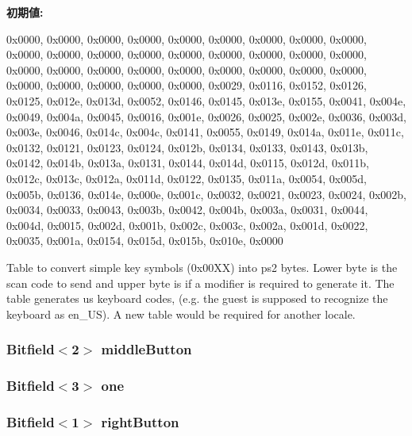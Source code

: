 \label{namespacePs2_a23aeb10a3924a5bdb7f4f9e21b03e515}
{\bfseries 初期値:}
\begin{DoxyCode}
 {

   0x0000, 0x0000, 0x0000, 0x0000, 0x0000, 0x0000, 0x0000, 0x0000, 
   0x0000, 0x0000, 0x0000, 0x0000, 0x0000, 0x0000, 0x0000, 0x0000, 
   0x0000, 0x0000, 0x0000, 0x0000, 0x0000, 0x0000, 0x0000, 0x0000, 
   0x0000, 0x0000, 0x0000, 0x0000, 0x0000, 0x0000, 0x0000, 0x0000, 
   0x0029, 0x0116, 0x0152, 0x0126, 0x0125, 0x012e, 0x013d, 0x0052, 
   0x0146, 0x0145, 0x013e, 0x0155, 0x0041, 0x004e, 0x0049, 0x004a, 
   0x0045, 0x0016, 0x001e, 0x0026, 0x0025, 0x002e, 0x0036, 0x003d, 
   0x003e, 0x0046, 0x014c, 0x004c, 0x0141, 0x0055, 0x0149, 0x014a, 
   0x011e, 0x011c, 0x0132, 0x0121, 0x0123, 0x0124, 0x012b, 0x0134, 
   0x0133, 0x0143, 0x013b, 0x0142, 0x014b, 0x013a, 0x0131, 0x0144, 
   0x014d, 0x0115, 0x012d, 0x011b, 0x012c, 0x013c, 0x012a, 0x011d, 
   0x0122, 0x0135, 0x011a, 0x0054, 0x005d, 0x005b, 0x0136, 0x014e, 
   0x000e, 0x001c, 0x0032, 0x0021, 0x0023, 0x0024, 0x002b, 0x0034, 
   0x0033, 0x0043, 0x003b, 0x0042, 0x004b, 0x003a, 0x0031, 0x0044, 
   0x004d, 0x0015, 0x002d, 0x001b, 0x002c, 0x003c, 0x002a, 0x001d, 
   0x0022, 0x0035, 0x001a, 0x0154, 0x015d, 0x015b, 0x010e, 0x0000  
}
\end{DoxyCode}
Table to convert simple key symbols (0x00XX) into ps2 bytes. Lower byte is the scan code to send and upper byte is if a modifier is required to generate it. The table generates us keyboard codes, (e.g. the guest is supposed to recognize the keyboard as en\_\-US). A new table would be required for another locale. \hypertarget{namespacePs2_a55b347b21558f05dcfd7e4817c08bb94}{
\subsubsection[{middleButton}]{\setlength{\rightskip}{0pt plus 5cm}Bitfield$<$2$>$ {\bf middleButton}}}
\label{namespacePs2_a55b347b21558f05dcfd7e4817c08bb94}
\hypertarget{namespacePs2_a1ad8e11da1d27b0aba8a7bd97199ea49}{
\subsubsection[{one}]{\setlength{\rightskip}{0pt plus 5cm}Bitfield$<$3$>$ {\bf one}}}
\label{namespacePs2_a1ad8e11da1d27b0aba8a7bd97199ea49}
\hypertarget{namespacePs2_a9f14f6a1f4da750d3ef23cf0a52428c5}{
\subsubsection[{rightButton}]{\setlength{\rightskip}{0pt plus 5cm}Bitfield$<$1$>$ {\bf rightButton}}}
